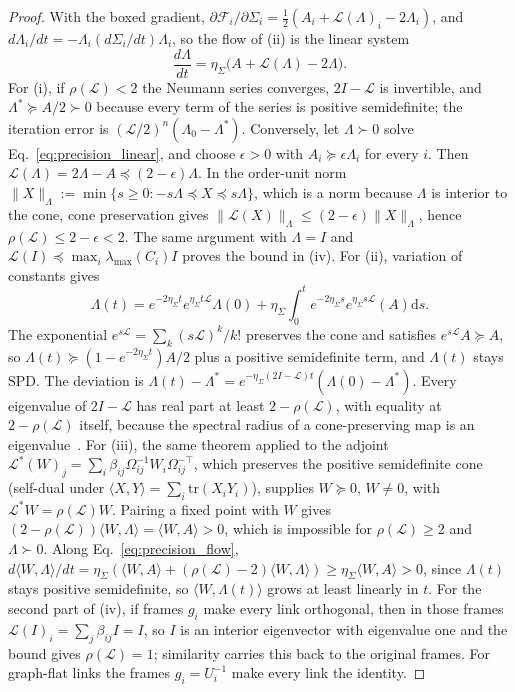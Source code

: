 \documentclass[11pt]{article}
\begin{document}
\begin{proof}
With the boxed gradient, $\partial\mathcal{F}_i/\partial\Sigma_i = \tfrac{1}{2}(A_i + \mathcal{L}(\Lambda)_i - 2\Lambda_i)$, and $d\Lambda_i/dt = -\Lambda_i(d\Sigma_i/dt)\Lambda_i$, so the flow of (ii) is the linear system
\begin{equation}
\frac{d\Lambda}{dt} = \eta_\Sigma\big(A + \mathcal{L}(\Lambda) - 2\Lambda\big).
\label{eq:precision_flow}
\end{equation}
For (i), if $\rho(\mathcal{L}) < 2$ the Neumann series converges, $2I - \mathcal{L}$ is invertible, and $\Lambda^* \succeq A/2 \succ 0$ because every term of the series is positive semidefinite; the iteration error is $(\mathcal{L}/2)^n(\Lambda_0 - \Lambda^*)$. Conversely, let $\Lambda \succ 0$ solve Eq.~\eqref{eq:precision_linear}, and choose $\epsilon > 0$ with $A_i \succeq \epsilon\Lambda_i$ for every $i$. Then $\mathcal{L}(\Lambda) = 2\Lambda - A \preceq (2-\epsilon)\Lambda$. In the order-unit norm $\|X\|_\Lambda := \min\{s \geq 0 : -s\Lambda \preceq X \preceq s\Lambda\}$, which is a norm because $\Lambda$ is interior to the cone, cone preservation gives $\|\mathcal{L}(X)\|_\Lambda \leq (2-\epsilon)\|X\|_\Lambda$, hence $\rho(\mathcal{L}) \leq 2 - \epsilon < 2$. The same argument with $\Lambda = I$ and $\mathcal{L}(I) \preceq \max_i\lambda_{\max}(C_i) I$ proves the bound in (iv). For (ii), variation of constants gives
\[
\Lambda(t) = e^{-2\eta_\Sigma t}e^{\eta_\Sigma t\mathcal{L}}\Lambda(0) + \eta_\Sigma\int_0^t e^{-2\eta_\Sigma s}e^{\eta_\Sigma s\mathcal{L}}(A)\mathrm{d}s.
\]
The exponential $e^{s\mathcal{L}} = \sum_k (s\mathcal{L})^k/k!$ preserves the cone and satisfies $e^{s\mathcal{L}}A \succeq A$, so $\Lambda(t) \succeq (1 - e^{-2\eta_\Sigma t})A/2$ plus a positive semidefinite term, and $\Lambda(t)$ stays SPD. The deviation is $\Lambda(t) - \Lambda^* = e^{-\eta_\Sigma(2I - \mathcal{L})t}(\Lambda(0) - \Lambda^*)$. Every eigenvalue of $2I - \mathcal{L}$ has real part at least $2 - \rho(\mathcal{L})$, with equality at $2 - \rho(\mathcal{L})$ itself, because the spectral radius of a cone-preserving map is an eigenvalue~\cite{Vandergraft1968}. For (iii), the same theorem applied to the adjoint $\mathcal{L}^*(W)_j = \sum_i\beta_{ij}\Omega_{ij}^{-1}W_i\Omega_{ij}^{-\top}$, which preserves the positive semidefinite cone (self-dual under $\langle X, Y\rangle = \sum_i\mathrm{tr}(X_iY_i)$), supplies $W \succeq 0$, $W \neq 0$, with $\mathcal{L}^*W = \rho(\mathcal{L})W$. Pairing a fixed point with $W$ gives $(2 - \rho(\mathcal{L}))\langle W, \Lambda\rangle = \langle W, A\rangle > 0$, which is impossible for $\rho(\mathcal{L}) \geq 2$ and $\Lambda \succ 0$. Along Eq.~\eqref{eq:precision_flow}, $d\langle W, \Lambda\rangle/dt = \eta_\Sigma(\langle W, A\rangle + (\rho(\mathcal{L}) - 2)\langle W, \Lambda\rangle) \geq \eta_\Sigma\langle W, A\rangle > 0$, since $\Lambda(t)$ stays positive semidefinite, so $\langle W, \Lambda(t)\rangle$ grows at least linearly in $t$. For the second part of (iv), if frames $g_i$ make every link orthogonal, then in those frames $\mathcal{L}(I)_i = \sum_j\beta_{ij}I = I$, so $I$ is an interior eigenvector with eigenvalue one and the bound gives $\rho(\mathcal{L}) = 1$; similarity carries this back to the original frames. For graph-flat links the frames $g_i = U_i^{-1}$ make every link the identity.

\end{proof}
\end{document}
